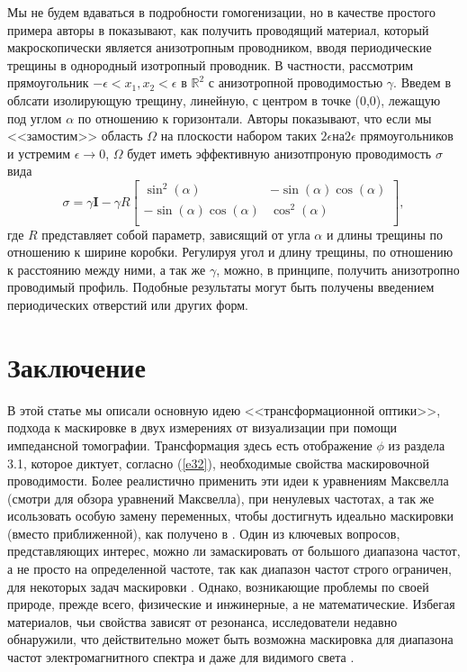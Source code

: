 \documentclass[a4paper, 12pt]{article}
\begin{document}
Мы не будем вдаваться в подробности гомогенизации, но в качестве простого примера 
авторы в \cite{3} показывают, как получить проводящий материал, который 
макроскопически является анизотропным проводником, вводя периодические трещины
в однородный изотропный проводник. В частности, рассмотрим прямоугольник $-\epsilon < 
x_1,x_2<\epsilon$ в $\mathbb{R}^2$ с анизотропной проводимостью $\gamma$. Введем в 
облсати изолирующую трещину, линейную, с центром в точке (0,0), лежащую под углом 
$\alpha$ по отношению к горизонтали. Авторы \cite{3} показывают, что если мы 
<<замостим>> область $\Omega$ на плоскости набором таких $2\epsilon \text{на}
2\epsilon$ прямоугольников и устремим $\epsilon \to 0$, $\Omega$ будет иметь
эффективную анизотпроную проводимость $\sigma$ вида
\begin{equation*}
\sigma = \gamma \textbf{I}-\gamma R
 \begin{bmatrix}
  \sin^2(\alpha) & -\sin(\alpha)\cos(\alpha) \\
  -\sin(\alpha)\cos(\alpha) & \cos^2(\alpha) \\
 \end{bmatrix},
\end{equation*}
где $R$ представляет собой параметр, зависящий от угла $\alpha$ и длины трещины по
отношению к ширине коробки. Регулируя угол и длину трещины, по отношению к расстоянию
между ними, а так же $\gamma$, можно, в принципе, получить анизотропно проводимый 
профиль. Подобные результаты могут быть получены введением периодических отверстий
или других форм.

\section{Заключение}
В этой статье мы описали основную идею <<трансформационной оптики>>, подхода к 
маскировке в двух измерениях от визуализации при помощи импедансной томографии.
Трансформация здесь есть отображение $\phi$ из раздела 3.1, которое диктует,
согласно (\ref{e32}), необходимые свойства маскировочной проводимости. Более
реалистично применить эти идеи к уравнениям Максвелла (смотри \cite[стр.358-361]{27}
для обзора уравнений Максвелла), при ненулевых частотах, а так же исользовать особую
замену переменных, чтобы достигнуть идеально маскировки (вместо приближенной), как
получено в \cite{7}. Один из ключевых вопросов, представляющих интерес, можно ли
замаскировать от большого диапазона частот, а не просто на определенной частоте, так
как диапазон частот строго ограничен, для некоторых задач маскировки \cite{4}. 
Однако, возникающие проблемы по своей природе, прежде всего, физические и инжинерные,
а не математические. Избегая материалов, чьи свойства зависят от резонанса, 
исследователи недавно обнаружили, что действительно может быть возможна маскировка для 
диапазона частот электромагнитного спектра и даже для видимого света \cite{17,18}.
\end{document}
